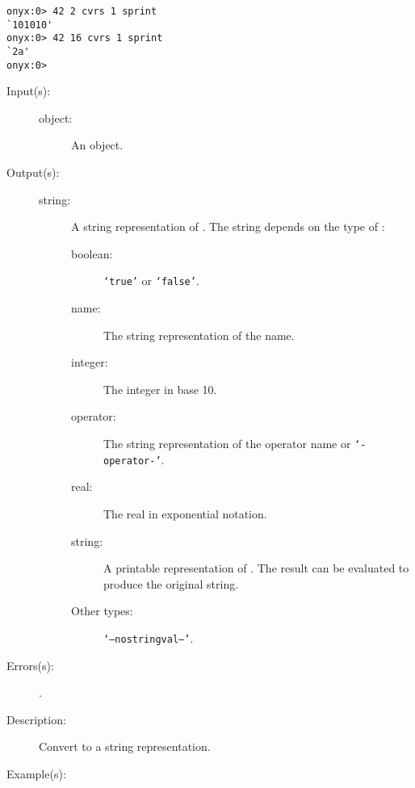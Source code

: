 \begin{description}
\begin{description}
\begin{verbatim}
onyx:0> 42 2 cvrs 1 sprint
`101010'
onyx:0> 42 16 cvrs 1 sprint
`2a'
onyx:0>
		\end{verbatim}
	\end{description}
\label{systemdict:cvs}
\item[{\onyxop{object}{cvs}{string}}: ]
	\begin{description}\item[]
	\item[Input(s): ]
		\begin{description}\item[]
		\item[object: ]
			An object.
		\end{description}
	\item[Output(s): ]
		\begin{description}\item[]
		\item[string: ]
			A string representation of .  The string
			depends on the type of :
			\begin{description}
			\item[boolean: ] {\tt `true'} or  {\tt `false'}.
			\item[name: ] The string representation of the name.
			\item[integer: ] The integer in base 10.
			\item[operator: ] The string representation of the
			operator name or {\tt `-operator-'}.
			\item[real: ] The real in exponential notation.
			\item[string: ] A printable representation of
			.  The result can be evaluated to produce
			the original string.
			\item[Other types: ] {\tt `--nostringval--'}.
			\end{description}
		\end{description}
	\item[Errors(s): ]
		\begin{description}\item[]
		\item[.]
		\end{description}
	\item[Description: ]
		Convert  to a string representation.
	\item[Example(s): ]\begin{verbatim}


\end{verbatim}
\end{description}
\end{description}
